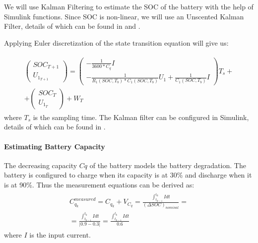 We will use Kalman Filtering to estimate the SOC of the battery with the help of Simulink functions. Since SOC is non-linear, we will use an Unscented Kalman Filter, details of which can be found in \cite{6183271} and \cite{882463}.

Applying Euler discretization of the state transition equation will give us:

\begin{equation*}
  \label{state transition_2}
\begin{aligned}
\begin{split}
 \left( \begin{array}{c} SOC_{T+1} \\ U_{1_{T+1}}\end{array}\right) = 
 \left( \begin{array}{c} -\frac{1}{3600*C_q}I \\-\frac{1}{R_1(SOC, T_b)*C_1(SOC, T_b)}U_1 + \frac{1}{C_1(SOC, T_b)}I\end{array}\right)T_s + \\
 + \left( \begin{array}{c} SOC_{T} \\ U_{1_{T}}\end{array}\right) + W_T
 \end{split}
 \end{aligned}
\end{equation*}
where $T_s$ is the sampling time.
The Kalman filter can be configured in Simulink, details of which can be found in \cite{6183271}.

\paragraph{Estimating Battery Capacity}
The decreasing capacity $Cq$ of the battery models the battery degradation. The battery is configured to charge when its capacity is at 30\% and discharge when it is at 90\%. Thus the measurement equations can be derived as:
\begin{equation}
  \label{measurement_equation}
\begin{aligned}
\begin{split}
 C_{q_k}^{measured} = C_{q_{k}} + V_{C_{q}} =  \frac{\int_{t_{k-1}}^{t_{k}}Idt} {(\Delta SOC)_{nominal}} = \\ = \frac{\int_{t_{k-1}}^{t_{k}}Idt} {\left|0.9 - 0.3 \right|} = \frac{\int_{t_{k-1}}^{t_{k}}Idt} {0.6}
 \end{split}
 \end{aligned}
\end{equation}
where $I$ is the input current.

